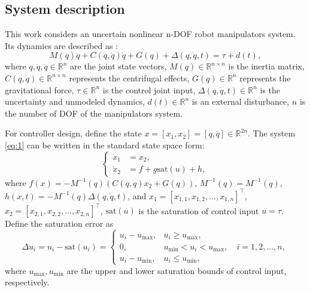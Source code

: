 \documentclass[pdflatex,sn-mathphys-num]{sn-jnl}%
\theoremstyle{thmstyleone}%
\theoremstyle{thmstyletwo}%
\theoremstyle{thmstylethree}%
\begin{document}
\subsection{System description}
\par This work considers an uncertain nonlinear n-DOF robot manipulators system. Its dynamics are described as \cite{SciaviccoSiciliano_2012_ModellingControl,BagheriEtAl_2019_Feedbacklinearization}:
\begin{equation}
	M(q)\ddot{q} + C(q, \dot{q})\dot{q} + G(q)+ \Delta(q, \dot{q}, t)= \tau + d(t),
	\label{eq:1}
\end{equation}
where $ q, \dot{q}, \ddot{q} \in \mathbb{R}^n $ are the joint state vectors, $M(q) \in \mathbb{R}^{n\times n}$ is the inertia matrix, $C(q, \dot{q}) \in \mathbb{R}^{n\times n} $ represents the centrifugal effects, $G(q) \in \mathbb{R}^n $ represents the gravitational force, $\tau \in \mathbb{R}^n$ is the control joint input, $\Delta(q, \dot{q}, t) \in \mathbb{R}^n$ is the uncertainty and unmodeled dynamics, $d(t) \in \mathbb{R}^n$ is an external disturbance, $n$ is the number of DOF of the manipulators system.

For controller design, define the state $x = [x_1,x_2] = [q,\dot{q}] \in \mathbb{R}^{2n}$. The system \cref{eq:1} can be written in the standard state space form:
\begin{equation}
	\left\{
	\begin{aligned}
		\dot{x}_1 & = x_2,     \\
		\dot{x}_2 & =f +g \mathrm{sat}(u) +h,
	\end{aligned}
	\right.
	\label{eq:2}
\end{equation}
where $f(x)=-M^{-1}(q) (C(q,\dot{q})x_2 + G(q)) $, $M^{-1}(q)=M^{-1}(q)$, $h(x,t)=-M^{-1}(q)\Delta(q,\dot{q},t)$, and $x_1=[x_{1,1},x_{1,2},...,x_{1,n}]^{\top}$, $x_2=[x_{2,1},x_{2,2},...,x_{2,n}]^{\top}$, $\mathrm{sat}(u)$ is the saturation of control input $u=\tau$. Define the saturation error as
\begin{equation}\label{eq:3}
\Delta u_{i} =  u_{i}-\mathrm{sat}(u_i)=\begin{cases} 
	u_{i}-u_{\max}, & u_i \geq u_{\max}, \\
0,       & u_{\min} < u_i < u_{\max},  \quad i=1,2,...,n,\\
u_{i}-u_{\min}, & u_i \leq u_{\min},
\end{cases}
\end{equation}
where $u_{\max},u_{\min}$ are the upper and lower saturation bounds of control input, respectively.
\end{document}
